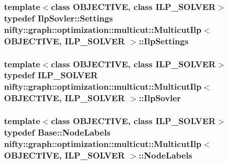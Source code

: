 \subsubsection[{Ilp\+Settings}]{\setlength{\rightskip}{0pt plus 5cm}template$<$class O\+B\+J\+E\+C\+T\+I\+V\+E, class I\+L\+P\+\_\+\+S\+O\+L\+V\+E\+R$>$ typedef Ilp\+Sovler\+::\+Settings {\bf nifty\+::graph\+::optimization\+::multicut\+::\+Multicut\+Ilp}$<$ O\+B\+J\+E\+C\+T\+I\+V\+E, I\+L\+P\+\_\+\+S\+O\+L\+V\+E\+R $>$\+::{\bf Ilp\+Settings}}\label{classnifty_1_1graph_1_1optimization_1_1multicut_1_1MulticutIlp_a61b515766e63459084d16525e62c527d}
\hypertarget{classnifty_1_1graph_1_1optimization_1_1multicut_1_1MulticutIlp_ac85f089fd12431bd80f33c83dd45bdc7}{}
\subsubsection[{Ilp\+Sovler}]{\setlength{\rightskip}{0pt plus 5cm}template$<$class O\+B\+J\+E\+C\+T\+I\+V\+E, class I\+L\+P\+\_\+\+S\+O\+L\+V\+E\+R$>$ typedef I\+L\+P\+\_\+\+S\+O\+L\+V\+E\+R {\bf nifty\+::graph\+::optimization\+::multicut\+::\+Multicut\+Ilp}$<$ O\+B\+J\+E\+C\+T\+I\+V\+E, I\+L\+P\+\_\+\+S\+O\+L\+V\+E\+R $>$\+::{\bf Ilp\+Sovler}}\label{classnifty_1_1graph_1_1optimization_1_1multicut_1_1MulticutIlp_ac85f089fd12431bd80f33c83dd45bdc7}
\hypertarget{classnifty_1_1graph_1_1optimization_1_1multicut_1_1MulticutIlp_a0b5224bc8998dda829c920e8d3338fee}{}
\subsubsection[{Node\+Labels}]{\setlength{\rightskip}{0pt plus 5cm}template$<$class O\+B\+J\+E\+C\+T\+I\+V\+E, class I\+L\+P\+\_\+\+S\+O\+L\+V\+E\+R$>$ typedef {\bf Base\+::\+Node\+Labels} {\bf nifty\+::graph\+::optimization\+::multicut\+::\+Multicut\+Ilp}$<$ O\+B\+J\+E\+C\+T\+I\+V\+E, I\+L\+P\+\_\+\+S\+O\+L\+V\+E\+R $>$\+::{\bf Node\+Labels}}\label{classnifty_1_1graph_1_1optimization_1_1multicut_1_1MulticutIlp_a0b5224bc8998dda829c920e8d3338fee}
\hypertarget{classnifty_1_1graph_1_1optimization_1_1multicut_1_1MulticutIlp_a1c9fe5899608fc9c8e32bde6648c8278}{}
